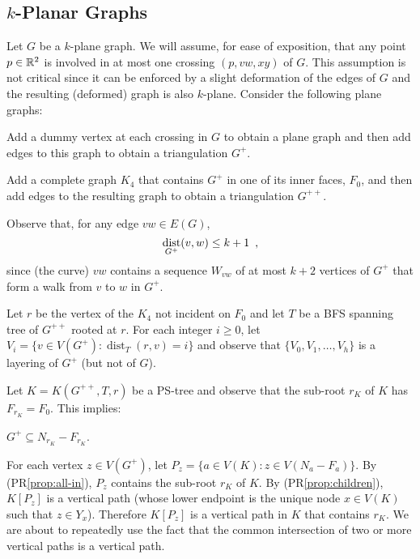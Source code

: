 \documentclass{patmorin}
\DeclareMathOperator{\dist}{dist}
\renewcommand{\proplabel}[1]{\label{prop:#1}}
\renewcommand{\propref}[1]{(PR\ref{prop:#1})}
\begin{document}
\subsection{$k$-Planar Graphs}

Let $G$ be a $k$-plane graph.  We will assume, for ease of exposition, that any point $p\in\mathbb{R}^2$ is involved in at most one crossing $(p,vw,xy)$ of $G$. This assumption is not critical since it can be enforced by a slight deformation of the edges of $G$ and the resulting (deformed) graph is also $k$-plane.   Consider the following plane graphs:
\begin{compactenum}
  \item Add a dummy vertex at each crossing in $G$ to obtain a plane graph and then add edges to this graph to obtain a triangulation $G^+$.
  
  \item Add a complete graph $K_4$ that contains $G^{+}$ in one of its inner faces, $F_0$, and then add edges to the resulting graph to obtain a triangulation $G^{++}$.
\end{compactenum}
Observe that, for any edge $vw\in E(G)$, 
\begin{equation}  
  \dist_{G^+}(v,w) \le k+1 \enspace ,  \eqlabel{distance-preserving}
\end{equation}
since (the curve) $vw$ contains a sequence $W_{vw}$ of at most $k+2$ vertices of $G^+$ that form a walk from $v$ to $w$ in $G^+$.

Let $r$ be the vertex of the $K_4$ not incident on $F_0$ and let $T$ be a BFS spanning tree of $G^{++}$ rooted at $r$. 
For each integer $i\ge 0$, let $V_i=\{v\in V(G^+): \dist_{T}(r,v)=i\}$ and observe that $\{V_0,V_1,\ldots,V_{h}\}$ is a layering of $G^+$ (but not of $G$).

Let $K=K(G^{++},T,r)$ be a PS-tree and observe that the sub-root $r_K$ of $K$ has $F_{r_K}=F_0$.  This implies:
\begin{compactenum}[(PR1)]\setcounter{enumi}{4}
  \item \proplabel{all-in}  $G^+\subseteq N_{r_K}-F_{r_K}$.
\end{compactenum}

For each vertex $z\in V(G^+)$, let $P_z=\{a\in V(K): z\in V(N_a-F_a)\}$.  
By \propref{all-in}, $P_{z}$ contains the sub-root $r_K$ of $K$.  By \propref{children}, $K[P_z]$ is a vertical path (whose lower endpoint is the unique node $x\in V(K)$ such that $z\in Y_x$). Therefore $K[P_z]$ is a vertical path in $K$ that contains $r_K$.  We are about to repeatedly use the fact that the common intersection of two or more vertical paths is a vertical path. 
\end{document}
